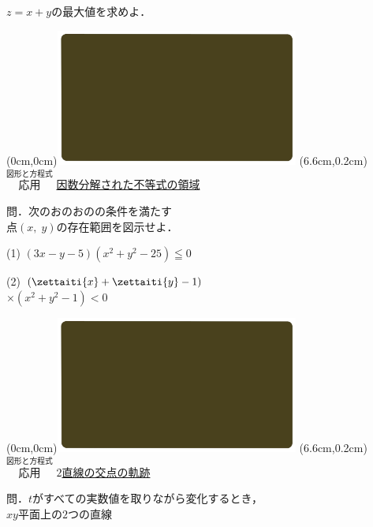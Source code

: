 \documentclass[10pt,
fleqn,
dvipdfmx,
uplatex
]{jsarticle}
\begin{document}
\Large
\vspace{-0.0zw}
\hfill $z=x+y$の最大値を求めよ．

\newpage

\at(0cm,0cm){\includegraphics[width=8cm,bb=0 0 1920 1080]{./youtube/thumbnails/templates/smart_background/図形と方程式.jpeg}}
\at(6.6cm,0.2cm){\small\color{bradorange}$\overset{\text{図形と方程式}}{\text{応用}}$}
{\color{orange}\Large\underline{因数分解された不等式の領域}}\vspace{0.3zw}

\small
問．次のおのおのの条件を満たす\\
\hfill 点$\left(x,\;y\right)$の存在範囲を図示せよ．

\vspace{0.0zw}
\small (1) $\left(3x-y-5\right)\left(x^2+y^2-{25}\right)\leqq 0$\vspace{-0.2zw}

\small (2) \LARGE  $\left(\zettaiti{x}+\zettaiti{y}-1\right)$\\
\hfill $\times\left(x^2+y^2-1\right)<0$\\

\newpage

\at(0cm,0cm){\includegraphics[width=8cm,bb=0 0 1920 1080]{./youtube/thumbnails/templates/smart_background/図形と方程式.jpeg}}
\at(6.6cm,0.2cm){\small\color{bradorange}$\overset{\text{図形と方程式}}{\text{応用}}$}
{\color{orange}\huge\underline{$2$直線の交点の軌跡}}\vspace{0.3zw}

\small 
問．$t$がすべての実数値を取りながら変化するとき，\\
\hfill $xy$平面上の$2$つの直線\vspace{-1zw}
\end{document}
